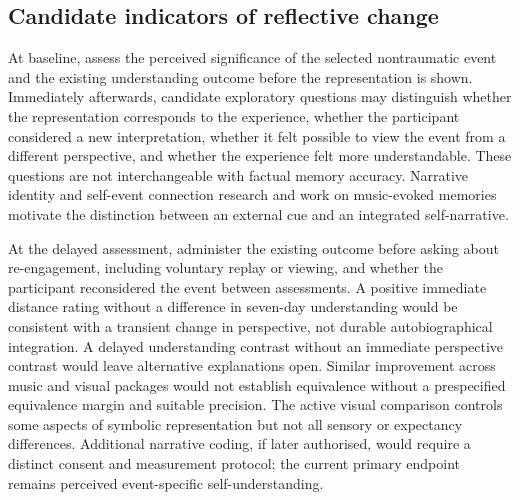 \documentclass[11pt,a4paper]{article}
\begin{document}
\subsection{Candidate indicators of reflective change}
At baseline, assess the perceived significance of the selected nontraumatic event and the existing understanding outcome before the representation is shown. Immediately afterwards, candidate exploratory questions may distinguish whether the representation corresponds to the experience, whether the participant considered a new interpretation, whether it felt possible to view the event from a different perspective, and whether the experience felt more understandable. These questions are not interchangeable with factual memory accuracy. Narrative identity and self-event connection research \citep{mcadams2013,pasupathi2007} and work on music-evoked memories \citep{janata2009} motivate the distinction between an external cue and an integrated self-narrative.

At the delayed assessment, administer the existing outcome before asking about re-engagement, including voluntary replay or viewing, and whether the participant reconsidered the event between assessments. A positive immediate distance rating without a difference in seven-day understanding would be consistent with a transient change in perspective, not durable autobiographical integration. A delayed understanding contrast without an immediate perspective contrast would leave alternative explanations open. Similar improvement across music and visual packages would not establish equivalence without a prespecified equivalence margin and suitable precision. The active visual comparison controls some aspects of symbolic representation but not all sensory or expectancy differences. Additional narrative coding, if later authorised, would require a distinct consent and measurement protocol; the current primary endpoint remains perceived event-specific self-understanding.
\end{document}

